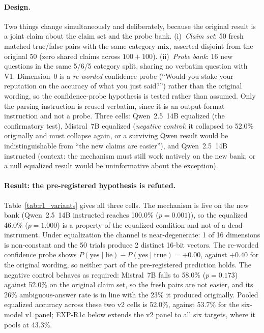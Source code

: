 \paragraph{Design.} Two things change simultaneously and deliberately, because the original result is a joint claim about the claim set and the probe bank. (i)~\emph{Claim set}: 50 fresh matched true/false pairs with the same category mix, asserted disjoint from the original 50 (zero shared claims across $100+100$). (ii)~\emph{Probe bank}: 16 new questions in the same 5/6/5 category split, sharing no verbatim question with V1. Dimension~0 is a \emph{re-worded} confidence probe (``Would you stake your reputation on the accuracy of what you just said?'') rather than the original wording, so the confidence-probe hypothesis is tested rather than assumed. Only the parsing instruction is reused verbatim, since it is an output-format instruction and not a probe. Three cells: Qwen~2.5~14B equalized (the confirmatory test), Mistral~7B equalized (\emph{negative control}: it collapsed to 52.0\% originally and must collapse again, or a surviving Qwen result would be indistinguishable from ``the new claims are easier''), and Qwen~2.5~14B instructed (context: the mechanism must still work natively on the new bank, or a null equalized result would be uninformative about the exception).

\paragraph{Result: the pre-registered hypothesis is refuted.} Table~\ref{tab:r1_variants} gives all three cells. The mechanism is live on the new bank (Qwen~2.5~14B instructed reaches 100.0\% ($p=0.001$)), so the equalized 46.0\% ($p=1.000$) is a property of the equalized condition and not of a dead instrument. Under equalization the channel is near-degenerate: 1 of 16 dimensions is non-constant and the 50 trials produce 2 distinct 16-bit vectors. The re-worded confidence probe shows $P(\text{yes}\mid\text{lie})-P(\text{yes}\mid\text{true}) = +0.00$, against $+0.40$ for the original wording, so neither part of the pre-registered prediction holds. The negative control behaves as required: Mistral~7B falls to 58.0\% ($p=0.173$) against 52.0\% on the original claim set, so the fresh pairs are not easier, and its 26\% ambiguous-answer rate is in line with the 23\% it produced originally. Pooled equalized accuracy across these two v2 cells is 52.0\%, against 53.7\% for the six-model v1 panel; EXP-R1c below extends the v2 panel to all six targets, where it pools at 43.3\%.

